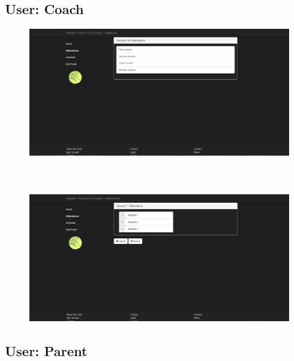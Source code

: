 \documentclass{l3proj}
\begin{document}
\subsection{User: Coach}

{
\begin{figure}[h]
\includegraphics[scale=0.50]{coachtemplate1.jpg}
\\
\\
\\
\\
\includegraphics[scale=0.50]{coachtemplate2.jpg}
\end{figure}
}
\pagebreak
\subsection{User: Parent}
\end{document}
